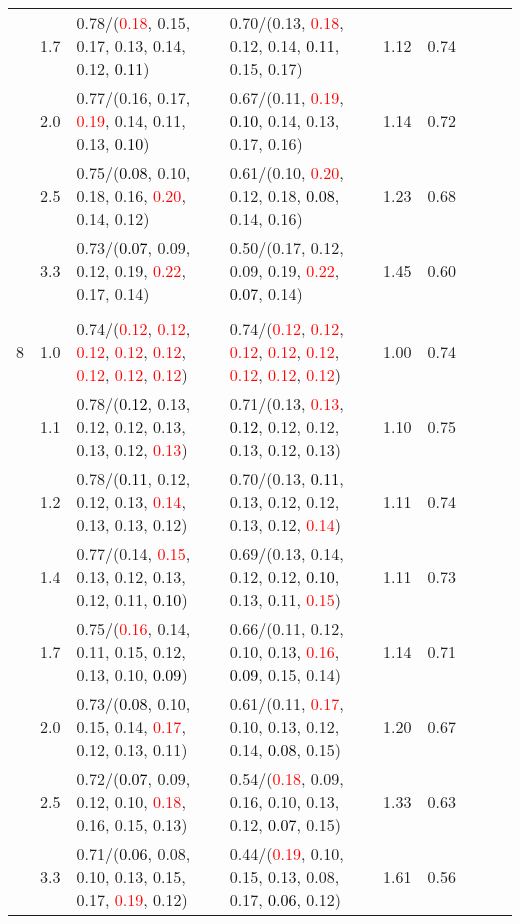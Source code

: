 \documentclass[10pt,a4paper]{report}
\begin{document}
\begin{table}[!htbp]
\begin{center}
{\begin{tabular}{ccllccccc}
			&1.7&0.78/(\textcolor{red}{0.18}, 0.15, 0.17, 0.13, 0.14, 0.12, \textcolor{black}{0.11})&0.70/(0.13, \textcolor{red}{0.18}, 0.12, 0.14, \textcolor{black}{0.11}, 0.15, 0.17)&1.12&0.74\\
			&2.0&0.77/(0.16, 0.17, \textcolor{red}{0.19}, 0.14, 0.11, 0.13, \textcolor{black}{0.10})&0.67/(0.11, \textcolor{red}{0.19}, \textcolor{black}{0.10}, 0.14, 0.13, 0.17, 0.16)&1.14&0.72\\
			&2.5&0.75/(\textcolor{black}{0.08}, 0.10, 0.18, 0.16, \textcolor{red}{0.20}, 0.14, 0.12)&0.61/(0.10, \textcolor{red}{0.20}, 0.12, 0.18, \textcolor{black}{0.08}, 0.14, 0.16)&1.23&0.68\\
			&3.3&0.73/(\textcolor{black}{0.07}, 0.09, 0.12, 0.19, \textcolor{red}{0.22}, 0.17, 0.14)&0.50/(0.17, 0.12, 0.09, 0.19, \textcolor{red}{0.22}, \textcolor{black}{0.07}, 0.14)&1.45&0.60\\
			&&&&\\
			8			&1.0&0.74/(\textcolor{red}{0.12}, \textcolor{red}{0.12}, \textcolor{red}{0.12}, \textcolor{red}{0.12}, \textcolor{red}{0.12}, \textcolor{red}{0.12}, \textcolor{red}{0.12}, \textcolor{red}{0.12})&0.74/(\textcolor{red}{0.12}, \textcolor{red}{0.12}, \textcolor{red}{0.12}, \textcolor{red}{0.12}, \textcolor{red}{0.12}, \textcolor{red}{0.12}, \textcolor{red}{0.12}, \textcolor{red}{0.12})&1.00&0.74\\
			&1.1&0.78/(\textcolor{black}{0.12}, 0.13, 0.12, 0.12, 0.13, 0.13, 0.12, \textcolor{red}{0.13})&0.71/(0.13, \textcolor{red}{0.13}, \textcolor{black}{0.12}, 0.12, 0.12, 0.13, 0.12, 0.13)&1.10&0.75\\
			&1.2&0.78/(\textcolor{black}{0.11}, 0.12, 0.12, 0.13, \textcolor{red}{0.14}, 0.13, 0.13, 0.12)&0.70/(0.13, \textcolor{black}{0.11}, 0.13, 0.12, 0.12, 0.13, 0.12, \textcolor{red}{0.14})&1.11&0.74\\
			&1.4&0.77/(0.14, \textcolor{red}{0.15}, 0.13, 0.12, 0.13, 0.12, 0.11, \textcolor{black}{0.10})&0.69/(0.13, 0.14, 0.12, 0.12, \textcolor{black}{0.10}, 0.13, 0.11, \textcolor{red}{0.15})&1.11&0.73\\
			&1.7&0.75/(\textcolor{red}{0.16}, 0.14, 0.11, 0.15, 0.12, 0.13, 0.10, \textcolor{black}{0.09})&0.66/(0.11, 0.12, 0.10, 0.13, \textcolor{red}{0.16}, \textcolor{black}{0.09}, 0.15, 0.14)&1.14&0.71\\
			&2.0&0.73/(\textcolor{black}{0.08}, 0.10, 0.15, 0.14, \textcolor{red}{0.17}, 0.12, 0.13, 0.11)&0.61/(0.11, \textcolor{red}{0.17}, 0.10, 0.13, 0.12, 0.14, \textcolor{black}{0.08}, 0.15)&1.20&0.67\\
			&2.5&0.72/(\textcolor{black}{0.07}, 0.09, 0.12, 0.10, \textcolor{red}{0.18}, 0.16, 0.15, 0.13)&0.54/(\textcolor{red}{0.18}, 0.09, 0.16, 0.10, 0.13, 0.12, \textcolor{black}{0.07}, 0.15)&1.33&0.63\\
			&3.3&0.71/(\textcolor{black}{0.06}, 0.08, 0.10, 0.13, 0.15, 0.17, \textcolor{red}{0.19}, 0.12)&0.44/(\textcolor{red}{0.19}, 0.10, 0.15, 0.13, 0.08, 0.17, \textcolor{black}{0.06}, 0.12)&1.61&0.56\\
			\bottomrule
		\end{tabular}}
	\end{center}
\end{table}
\end{document}
